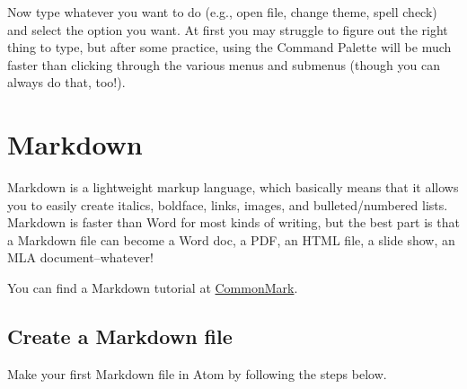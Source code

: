 \documentclass[]{book}
\theoremstyle{definition}
\theoremstyle{definition}
\theoremstyle{definition}
\theoremstyle{remark}
\begin{document}
Now type whatever you want to do (e.g., open file, change theme, spell
check) and select the option you want. At first you may struggle to
figure out the right thing to type, but after some practice, using the
Command Palette will be much faster than clicking through the various
menus and submenus (though you can always do that, too!).

\hypertarget{markdown}{%
\chapter{Markdown}\label{markdown}}

Markdown is a lightweight markup language, which basically means that it
allows you to easily create italics, boldface, links, images, and
bulleted/numbered lists. Markdown is faster than Word for most kinds of
writing, but the best part is that a Markdown file can become a Word
doc, a PDF, an HTML file, a slide show, an MLA document--whatever!

You can find a Markdown tutorial at
\href{https://commonmark.org/help/tutorial/}{CommonMark}.

\hypertarget{create-a-markdown-file}{%
\section{Create a Markdown file}\label{create-a-markdown-file}}

Make your first Markdown file in Atom by following the steps below.
\end{document}
